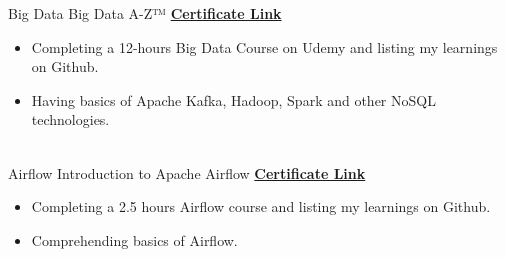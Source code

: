\documentclass[letterpaper]{DS_class_file} %
\begin{document}
\begin{twenty}
	\twentyitem
	{Big Data}
	{}
	{\hspace{0.3cm}Big Data A-Z™}
	{\href{https://www.udemy.com/certificate/UC-4a851250-cc99-4a9d-8f7c-d8a32ed0a832/}{\textbf{Certificate Link}}}
	{}
	{
		{\begin{itemize}
				\item Completing a 12-hours Big Data Course on Udemy and listing my learnings on Github.
				\item Having basics of Apache Kafka, Hadoop, Spark and other NoSQL technologies.
		\end{itemize}}
	}
	\\
	\twentyitem
	{Airflow}
	{}
	{\hspace{0.3cm}Introduction to Apache Airflow}
	{\href{https://www.udemy.com/certificate/UC-634f3164-fcb1-4bdf-b5b0-909134dd3252/}{\textbf{Certificate Link}}}
	{}
	{
		{\begin{itemize}
				\item Completing a 2.5 hours Airflow course and listing my learnings on Github.
				\item Comprehending basics of Airflow.
		\end{itemize}}
	}
	

	
\end{twenty}



	
\end{document}
